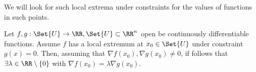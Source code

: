 \begin{rem}
  We will look for such local extrema under constraints for the values of functions in such points.
\end{rem}
\begin{thm}
  \label{thm:lagrangeMult}
  Let $f, g:\Set{U}\to\RR, \Set{U}\subset\RR^n$ open be continuously differentiable functions. Assume $f$ has a local extremum at $x_0\in\Set{U}$ under constraint $g(x)=0$. Then, assuming that $\nabla f(x_0), \nabla g(x_0)\neq0$, if follows that $\exists \lambda\in\RR\setminus\{0\}$ with $\nabla f(x_0)=\lambda\nabla g(x_0)$.
\end{thm}